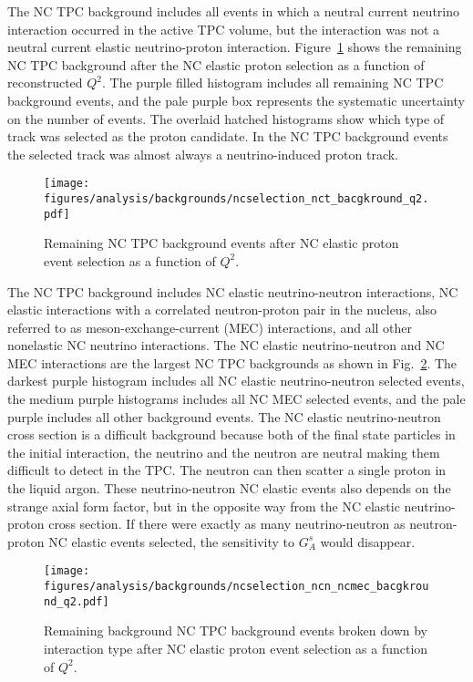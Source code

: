     The NC TPC background includes all events in which a neutral current
    neutrino interaction occurred in the active TPC volume, but the interaction
    was not a neutral current elastic neutrino-proton interaction.
    Figure~\ref{fig:selectednctpc} shows the remaining NC TPC background after
    the NC elastic proton selection as a function of reconstructed $Q^2$. The
    purple filled histogram includes all remaining NC TPC background events,
    and the pale purple box represents the systematic uncertainty on the number
    of events. The overlaid hatched histograms show which type of track was
    selected as the proton candidate.  In the NC TPC background events the
    selected track was almost always a neutrino-induced proton track. 
    \begin{figure}[ht]
      \centering
      \texttt{[image: figures/analysis/backgrounds/ncselection\_nct\_bacgkround\_q2.pdf]}
      \caption{Remaining NC TPC background events after NC elastic
      proton event selection as a function of $Q^2$.}
      \label{fig:selectednctpc}
    \end{figure}
    
    The NC TPC background includes NC elastic neutrino-neutron interactions, NC
    elastic interactions with a correlated neutron-proton pair in the nucleus,
    also referred to as meson-exchange-current (MEC) interactions, and all
    other nonelastic NC neutrino interactions. The NC elastic neutrino-neutron
    and NC MEC interactions are the largest NC TPC backgrounds as shown in
    Fig.~\ref{fig:ncnmecbgs}. The darkest purple histogram includes all NC
    elastic neutrino-neutron selected events, the medium purple histograms
    includes all NC MEC selected events, and the pale purple includes all other
    background events. The NC elastic neutrino-neutron cross section is a
    difficult background because both of the final state particles in the
    initial interaction, the neutrino and the neutron are neutral making them
    difficult to detect in the TPC. The neutron can then scatter a single
    proton in the liquid argon. These neutrino-neutron NC elastic events also
    depends on the strange axial form factor, but in the opposite way from the
    NC elastic neutrino-proton cross section. If there were exactly as many
    neutrino-neutron as neutron-proton NC elastic events selected, the
    sensitivity to $G_A^s$ would disappear. 
    \begin{figure}[ht]
      \centering
      \texttt{[image: figures/analysis/backgrounds/ncselection\_ncn\_ncmec\_bacgkround\_q2.pdf]}
      \caption{Remaining background NC TPC background events broken down by
      interaction type after NC elastic proton event selection as a function of
      $Q^2$.}
      \label{fig:ncnmecbgs}
    \end{figure}

